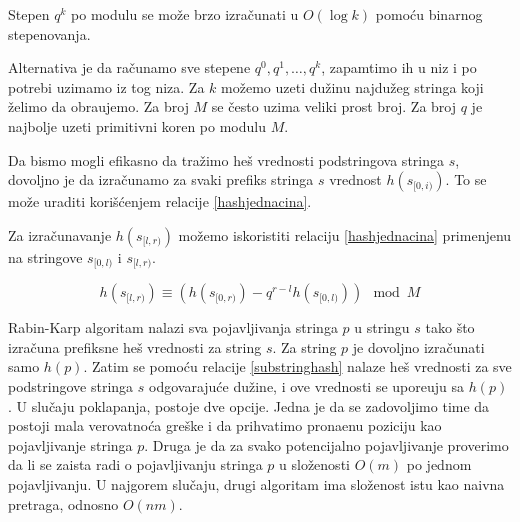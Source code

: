 Stepen $q^k$ po modulu se mo\v ze brzo izra\v cunati u $O(\log k)$ pomo\' cu binarnog stepenovanja.

\noindent
\begin{minipage}[l]{\textwidth}

\end{minipage}

Alternativa je da ra\v cunamo sve stepene $q^0, q^1, \ldots, q^k$, zapamtimo ih u niz i po potrebi uzimamo iz tog niza. Za $k$ mo\v zemo uzeti du\v zinu najdu\v zeg stringa koji \v zelimo da obra\dj ujemo. Za broj $M$ se \v cesto uzima veliki prost broj. Za broj $q$ je najbolje uzeti primitivni koren po modulu $M$.

\noindent
\begin{minipage}[l]{\textwidth}

\end{minipage}

Da bismo mogli efikasno da tra\v zimo he\v s vrednosti podstringova stringa $s$, dovoljno je da izra\v cunamo za svaki prefiks stringa $s$ vrednost $h(s_{[0,i)})$. To se mo\v ze uraditi kori\v s\' cenjem relacije \ref{hashjednacina}.

\noindent
\begin{minipage}[l]{\textwidth}

\end{minipage}

Za izra\v cunavanje $h(s_{[l, r)})$ mo\v zemo iskoristiti relaciju \ref{hashjednacina} primenjenu na stringove $s_{[0,l)}$ i $s_{[l,r)}$.

\begin{equation}
\label{substringhash}
    h(s_{[l, r)}) \equiv (h(s_{[0, r)}) - q^{r-l}h(s_{[0, l)})) \mod M
\end{equation}

Rabin-Karp algoritam nalazi sva pojavljivanja stringa $p$ u stringu $s$ tako \v sto izra\v cuna prefiksne he\v s vrednosti za string $s$. Za string $p$ je dovoljno izra\v cunati samo $h(p)$. Zatim se pomo\' cu relacije \ref{substringhash} nalaze he\v s vrednosti za sve podstringove stringa $s$ odgovaraju\' ce du\v zine, i ove vrednosti se upore\dj uju sa $h(p)$. U slu\v caju poklapanja, postoje dve opcije. Jedna je da se zadovoljimo time da postoji mala verovatno\' ca gre\v ske i da prihvatimo prona\dj enu poziciju kao pojavljivanje stringa $p$. Druga je da za svako potencijalno pojavljivanje proverimo da li se zaista radi o pojavljivanju stringa $p$ u slo\v zenosti $O(m)$ po jednom pojavljivanju. U najgorem slu\v caju, drugi algoritam ima slo\v zenost istu kao naivna pretraga, odnosno $O(nm)$.

